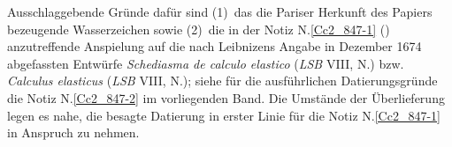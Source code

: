Ausschlaggebende Gründe dafür sind (1)~das die Pariser Herkunft des Papiers bezeugende Wasserzeichen sowie (2)~die in der Notiz N.\;\ref{Cc2_847-1} () anzutreffende Anspielung auf die nach Leibnizens Angabe in Dezember 1674 abgefassten Entwürfe \textit{Schediasma de calculo elastico} (\textit{LSB} VIII, N.)\cite{02617} bzw. \textit{Calculus elasticus} (\textit{LSB} VIII, N.);\cite{02609}
siehe für die ausführlichen Datierungsgründe die Notiz N.\;\ref{Cc2_847-2} im vorliegenden Band.
Die Umstände der Überlieferung legen es nahe, die besagte Datierung in erster Linie für die Notiz N.\;\ref{Cc2_847-1} in Anspruch zu nehmen.
\pend%
%
\frenchspacing%
\normalsize%
